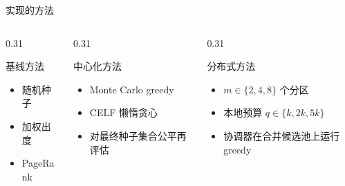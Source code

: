 \documentclass[UTF8, 10pt, aspectratio=169]{ctexbeamer}
\begin{document}
\begin{frame}{实现的方法}
    \begin{columns}[T,onlytextwidth]
        \begin{column}{0.31\linewidth}
            \begin{block}{基线方法}
                \begin{itemize}
                    \item 随机种子
                    \item 加权出度
                    \item PageRank
                \end{itemize}
            \end{block}
        \end{column}
        \begin{column}{0.31\linewidth}
            \begin{block}{中心化方法}
                \begin{itemize}
                    \item Monte Carlo greedy
                    \item CELF 懒惰贪心
                    \item 对最终种子集合公平再评估
                \end{itemize}
            \end{block}
        \end{column}
        \begin{column}{0.31\linewidth}
            \begin{block}{分布式方法}
                \begin{itemize}
                    \item $m\in\{2,4,8\}$ 个分区
                    \item 本地预算 $q\in\{k,2k,5k\}$
                    \item 协调器在合并候选池上运行 greedy
                \end{itemize}
            \end{block}
        \end{column}
    \end{columns}
\end{frame}
\end{document}
